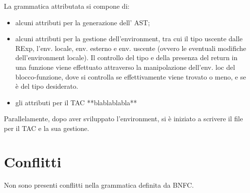\documentclass{article}
\begin{document}
La grammatica attributata si compone di:
\begin{itemize}
	\item alcuni attributi per la generazione dell' AST;
	\item alcuni attributi per la gestione dell'environment, tra cui il tipo uscente dalle RExp, l'env.
		locale, env. esterno e env. uscente (ovvero le eventuali modifiche dell'environment locale). Il
		controllo del tipo e della presenza del return in una funzione viene effettuato attraverso la manipolazione
		dell'env. loc del blocco-funzione, dove si controlla se effettivamente viene trovato o meno, e se è del tipo 
		desiderato.
	\item gli attributi per il TAC **blablablabla**
\end{itemize}

Parallelamente, dopo aver sviluppato l'environment, si è iniziato a scrivere il file per il TAC e la sua 
gestione.

\section{Conflitti}
Non sono presenti conflitti nella grammatica definita da BNFC.
\end{document}

